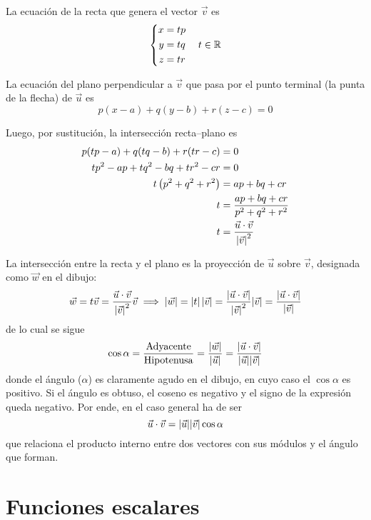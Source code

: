 \begin{center}
    \def\svgwidth{0.8\linewidth}
    
\end{center}

La ecuación de la recta que genera el vector $\vec{v}$ es
\[ \left\{
  \begin{aligned}
    x &= t p
    \\
    y &= t q
    \\
    z &= t r
  \end{aligned}
\right. \quad t \in \mathbb{R} \]

La ecuación del plano perpendicular a $\vec{v}$ que pasa por el punto terminal (la punta de la flecha) de $\vec{u}$ es
\[ p(x-a) + q(y-b) + r(z-c) = 0 \]

Luego, por sustitución, la intersección recta--plano es
\begin{align*}
    p(tp-a) + q(tq-b) + r(tr-c) &= 0
    \\
    tp^2 - ap + tq^2 - bq + tr^2 - cr &= 0
    \\
    t \left(p^2+q^2+r^2\right) &= ap + bq + cr
    \\
    t &= \frac{ap + bq + cr}{p^2+q^2+r^2}
    \\
    t &= \frac{\vec{u} \cdot \vec{v}}{{\left| {\vec{v}} \right|}^2}
\end{align*}

La intersección entre la recta y el plano es la proyección de $\vec{u}$ sobre $\vec{v}$, designada como $\vec{w}$ en el dibujo:
\[
  \vec{w} = t \vec{v} = \frac{\vec{u} \cdot \vec{v}}{{\left| {\vec{v}} \right|}^2} \vec{v}
  \implies
  {\left| {\vec{w}} \right|} = \left| t \right| {\left| {\vec{v}} \right|} = \frac{\left| \vec{u} \cdot \vec{v} \right|}{{\left| {\vec{v}} \right|}^2} {\left| {\vec{v}} \right|} = \frac{\left| \vec{u} \cdot \vec{v} \right|}{{\left| {\vec{v}} \right|}}
\]
de lo cual se sigue
\[ \cos \alpha = \frac{\text{Adyacente}}{\text{Hipotenusa}} = \frac{{\left| {\vec{w}} \right|}}{{\left| {\vec{u}} \right|}} = \frac{\left| \vec{u} \cdot \vec{v} \right|}{{\left| {\vec{u}} \right|}{\left| {\vec{v}} \right|}} \]
donde el ángulo ($\alpha$) es claramente agudo en el dibujo, en cuyo caso el $\cos\alpha$ es positivo.
Si el ángulo es obtuso, el coseno es negativo y el signo de la expresión queda negativo.
Por ende, en el caso general ha de ser
\[ \vec{u} \cdot \vec{v} = {\left| {\vec{u}} \right|} {\left| {\vec{v}} \right|} \cos \alpha \]
que relaciona el producto interno entre dos vectores con sus módulos y el ángulo que forman.


\section{Funciones escalares}
\label{sec:scalarFunctions}

